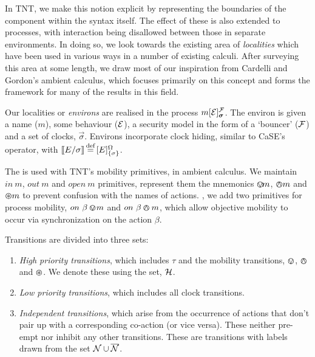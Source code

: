 \documentclass[orivec,envcountsame]{llncs}
\begin{document}
In TNT, we make this notion explicit by representing the boundaries of
the component within the syntax itself.  The effect of these is also
extended to processes, with interaction being disallowed between those
in separate environments.  In doing so, we look towards the existing
area of \emph{localities} \cite{obslocal,pawl} which have been used in
various ways in a number of existing calculi.  After surveying this area
at some length, we draw most of our inspiration from Cardelli and
Gordon's ambient calculus, which focuses primarily on this concept and
forms the framework for many of the results in this field.

Our localities or \emph{environs} are realised in the process
$\locv{m}{\expr}{\exprb}{\vec{\sigma}}$.  The environ is given a name
($m$), some behaviour ($\text{$\mathcal{E}$}$), a security model in the form of a
`bouncer' ($\text{$\mathcal{F}$}$) and a set of clocks, $\vec{\sigma}$.  Environs incorporate clock hiding,
similar to CaSE's operator, with $[\hspace{-0.3ex}[ E / \sigma ]\hspace{-0.3ex}] \operatorname{\stackrel{\textrm{def}}{=}} {}[ E ]^{\Omega}_{\{\sigma\}}$.

The  is used with TNT's mobility
primitives,  in
 ambient calculus.  We maintain
 $in\ m$, $out\ m$ and $open\ m$ primitives,
represent them 
the mnemonics $\varovee\!m$, $\varowedge m$ and $\varoast m$ to prevent
confusion with the names of actions.  , we add two primitives for
process mobility, $on\ \beta \varovee\!m$ and $on\ \beta \varowedge m$, which
allow objective mobility to occur via synchronization on the
action\MPS{\DELTEXT ,}{} $\beta$.


Transitions are divided into three sets:

\begin{enumerate}
\item \emph{High priority transitions}, which includes $\tau$ and
      the mobility transitions, $\varovee$, $\varowedge$ and $\varoast$.  We denote
      these using the set, $\text{$\mathcal{H}$}$.
\item \emph{Low priority transitions}, which includes all
      clock transitions.
\item \emph{Independent transitions}, which arise from the occurrence of
      actions that don't pair up with a corresponding co-action (or
      vice versa).  These neither pre-empt nor inhibit any other
      transitions.  These are transitions with labels drawn from the set
      $\text{$\mathcal{N}$} \cup \text{$\overline{\text{$\mathcal{N}$}}$}$.
\end{enumerate}
\end{document}
